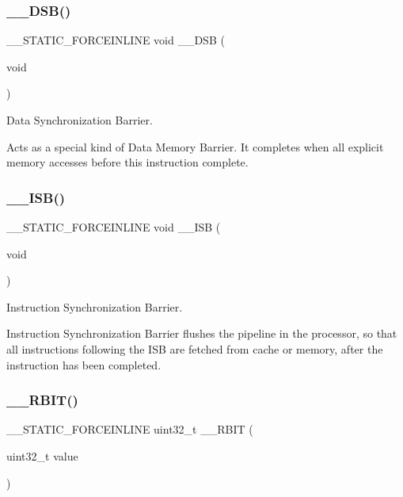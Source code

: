 \subsubsection{\texorpdfstring{\_\_DSB()}{\_\_DSB()}}
{\footnotesize\ttfamily \+\_\+\+\_\+\+S\+T\+A\+T\+I\+C\+\_\+\+F\+O\+R\+C\+E\+I\+N\+L\+I\+NE void \+\_\+\+\_\+\+D\+SB (\begin{DoxyParamCaption}\item[{void}]{ }\end{DoxyParamCaption})}



Data Synchronization Barrier. 

Acts as a special kind of Data Memory Barrier. It completes when all explicit memory accesses before this instruction complete. \mbox{\label{group___c_m_s_i_s___core___instruction_interface_gae26c2b3961e702aeabc24d4984ebd369}} 
\subsubsection{\texorpdfstring{\_\_ISB()}{\_\_ISB()}}
{\footnotesize\ttfamily \+\_\+\+\_\+\+S\+T\+A\+T\+I\+C\+\_\+\+F\+O\+R\+C\+E\+I\+N\+L\+I\+NE void \+\_\+\+\_\+\+I\+SB (\begin{DoxyParamCaption}\item[{void}]{ }\end{DoxyParamCaption})}



Instruction Synchronization Barrier. 

Instruction Synchronization Barrier flushes the pipeline in the processor, so that all instructions following the I\+SB are fetched from cache or memory, after the instruction has been completed. \mbox{\label{group___c_m_s_i_s___core___instruction_interface_gaf944a7b7d8fd70164cca27669316bcf7}} 
\subsubsection{\texorpdfstring{\_\_RBIT()}{\_\_RBIT()}}
{\footnotesize\ttfamily \+\_\+\+\_\+\+S\+T\+A\+T\+I\+C\+\_\+\+F\+O\+R\+C\+E\+I\+N\+L\+I\+NE uint32\+\_\+t \+\_\+\+\_\+\+R\+B\+IT (\begin{DoxyParamCaption}\item[{uint32\+\_\+t}]{value }\end{DoxyParamCaption})}



